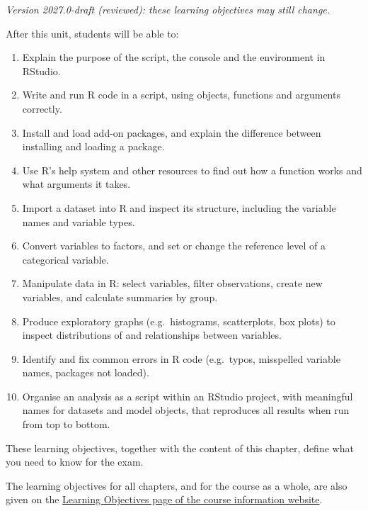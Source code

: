 \documentclass[
  letterpaper,
  8pt,
  a4paper]{book}
\providecommand{\tightlist}{%
  \setlength{\itemsep}{0pt}\setlength{\parskip}{0pt}}
\begin{document}
\begin{tcolorbox}[enhanced jigsaw, arc=.35mm, bottomrule=.15mm, bottomtitle=1mm, breakable, colback=white, colbacktitle=quarto-callout-note-color!10!white, colframe=quarto-callout-note-color-frame, coltitle=black, left=2mm, leftrule=.75mm, opacityback=0, opacitybacktitle=0.6, rightrule=.15mm, title=\textcolor{quarto-callout-note-color}{\faInfo}\hspace{0.5em}{Learning objectives}, titlerule=0mm, toprule=.15mm, toptitle=1mm]

\emph{Version 2027.0-draft (reviewed): these learning objectives may
still change.}

After this unit, students will be able to:

\begin{enumerate}
\def\labelenumi{\arabic{enumi}.}
\tightlist
\item
  Explain the purpose of the script, the console and the environment in
  RStudio.
\item
  Write and run R code in a script, using objects, functions and
  arguments correctly.
\item
  Install and load add-on packages, and explain the difference between
  installing and loading a package.
\item
  Use R's help system and other resources to find out how a function
  works and what arguments it takes.
\item
  Import a dataset into R and inspect its structure, including the
  variable names and variable types.
\item
  Convert variables to factors, and set or change the reference level of
  a categorical variable.
\item
  Manipulate data in R: select variables, filter observations, create
  new variables, and calculate summaries by group.
\item
  Produce exploratory graphs (e.g.~histograms, scatterplots, box plots)
  to inspect distributions of and relationships between variables.
\item
  Identify and fix common errors in R code (e.g.~typos, misspelled
  variable names, packages not loaded).
\item
  Organise an analysis as a script within an RStudio project, with
  meaningful names for datasets and model objects, that reproduces all
  results when run from top to bottom.
\end{enumerate}

These learning objectives, together with the content of this chapter,
define what you need to know for the exam.

The learning objectives for all chapters, and for the course as a whole,
are also given on the
\href{https://opetchey.github.io/BIO144_Course_Information/3.1-learning-objectives.html}{Learning
Objectives page of the course information website}.

\end{tcolorbox}
\end{document}
